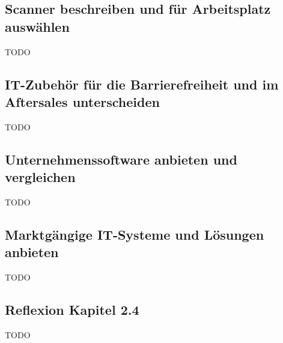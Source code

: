 \subsection{Scanner beschreiben und für Arbeitsplatz auswählen}
    TODO
\subsection{IT-Zubehör für die Barrierefreiheit und im Aftersales unterscheiden}
    TODO
\subsection{Unternehmenssoftware anbieten und vergleichen}
    TODO
\subsection{Marktgängige IT-Systeme und Lösungen anbieten}
    TODO
\subsection*{Reflexion Kapitel 2.4}
    \begin{refindent}
        TODO
    \end{refindent}